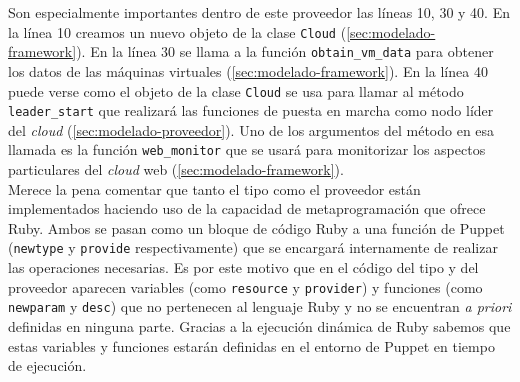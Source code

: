 Son especialmente importantes dentro de este proveedor las líneas 10, 30 y 40. En la línea 10 creamos un nuevo objeto de la clase \texttt{Cloud} (\ref{sec:modelado-framework}). En la línea 30 se llama a la función \texttt{obtain\_vm\_data} para obtener los datos de las máquinas virtuales (\ref{sec:modelado-framework}). En la línea 40 puede verse como el objeto de la clase \texttt{Cloud} se usa para llamar al método \texttt{leader\_start} que realizará las funciones de puesta en marcha como nodo líder del \emph{cloud} (\ref{sec:modelado-proveedor}). Uno de los argumentos del método en esa llamada es la función \texttt{web\_monitor} que se usará para monitorizar los aspectos particulares del \emph{cloud} web (\ref{sec:modelado-framework}). \\

Merece la pena comentar que tanto el tipo como el proveedor están implementados haciendo uso de la capacidad de metaprogramación que ofrece Ruby. Ambos se pasan como un bloque de código Ruby a una función de Puppet (\texttt{newtype} y \texttt{provide} respectivamente) que se encargará internamente de realizar las operaciones necesarias. Es por este motivo que en el código del tipo y del proveedor aparecen variables (como \texttt{resource} y \texttt{provider}) y funciones (como \texttt{newparam} y \texttt{desc}) que no pertenecen al lenguaje Ruby y no se encuentran \emph{a priori} definidas en ninguna parte. Gracias a la ejecución dinámica de Ruby sabemos que estas variables y funciones estarán definidas en el entorno de Puppet en tiempo de ejecución.

